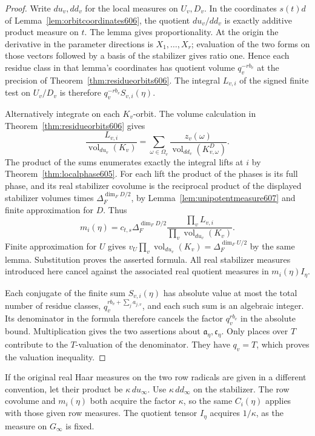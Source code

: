 \documentclass[a4paper,11pt]{article}
\theoremstyle{definition}
\theoremstyle{remark}
\numberwithin{equation}{section}
\begin{document}
\begin{proof}
Write \(du_v,dd_v\) for the local measures on \(U_v,D_v\).
In the coordinates \(s(t)d\) of
Lemma~\ref{lem:orbitcoordinates606}, the quotient \(du_v/dd_v\)
is exactly additive product measure on \(t\). The lemma gives
proportionality. At the origin the derivative in the parameter
directions is \(X_1,\ldots,X_r\); evaluation of the two forms
on those vectors followed by a basis of the stabilizer gives
ratio one. Hence each residue class in that lemma's coordinates
has quotient volume \(q_v^{-rb_v}\) at the precision of
Theorem~\ref{thm:residueorbits606}. The integral \(L_{v,i}\) of
the signed finite test on \(U_v/D_v\) is therefore
\(q_v^{-r b_v}S_{v,i}(\eta)\).

Alternatively integrate on each \(K_v\)-orbit. The volume
calculation in Theorem~\ref{thm:residueorbits606} gives
\[
 \frac{L_{v,i}}{\operatorname{vol}_{du_v}(K_v)}
       =\sum_{\omega\in\Omega_v}
          \frac{z_v(\omega)}{\operatorname{vol}_{dd_v}(K^D_{v,\omega})}.
\]
The product of the sums enumerates exactly the integral lifts
at \(i\) by Theorem~\ref{thm:localphase605}. For each lift the
product of the phases is its full phase, and its real
stabilizer covolume is the reciprocal product of the displayed
stabilizer volumes times \(\Delta_F^{\dim_F D/2}\), by
Lemma~\ref{lem:unipotentmeasure607} and finite approximation
for \(D\). Thus
\[
       m_i(\eta)=c_{t,s}\Delta_F^{\dim_F D/2}
                          \frac{\prod_v L_{v,i}}{\prod_v\operatorname{vol}_{du_v}(K_v)} .
\]
Finite approximation for \(U\) gives
\(v_U\prod_v\operatorname{vol}_{du_v}(K_v)
=\Delta_F^{\dim_F U/2}\) by the same lemma. Substitution
proves the asserted formula. All real stabilizer measures
introduced here cancel against the associated real quotient
measures in \(m_i(\eta)I_\eta\).

Each conjugate of the finite sum \(S_{v,i}(\eta)\) has
absolute value at most the total number of residue classes,
\(q_v^{r b_v+\sum_j a_{j,v}}\), and each such sum is an
algebraic integer. Its denominator in the formula therefore
cancels the factor \(q_v^{r b_v}\) in the absolute bound.
Multiplication gives the two assertions about
\(\mathfrak a_\eta,\mathfrak c_\eta\). Only places over \(T\)
contribute to the \(T\)-valuation of the denominator. They
have \(q_v=T\), which proves the valuation inequality.
\end{proof}

If the original real Haar measures on the two row radicals
are given in a different convention, let their product be
\(\kappa\,du_\infty\). Use \(\kappa\,dd_\infty\) on the
stabilizer. The row covolume and \(m_i(\eta)\) both acquire
the factor \(\kappa\), so the same \(C_i(\eta)\) applies
with those given row measures. The quotient tensor \(I_\eta\)
acquires \(1/\kappa\), as the measure on \(G_\infty\) is fixed.
\end{document}
